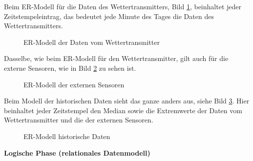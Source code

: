 Beim ER-Modell für die Daten des Wettertransmitters, Bild \ref{img:ER_Modell Wettertransmitter},  beinhaltet jeder Zeitstempeleintrag, das bedeutet jede Minute des Tages die Daten des Wettertransmitters. 

\begin{figure}[h!]
	\centering
	\caption{ER-Modell der Daten vom Wettertransmitter}
	\label{img:ER_Modell Wettertransmitter}
\end{figure}

Dasselbe, wie beim ER-Modell für den Wettertransmitter, gilt auch für die externe Sensoren, wie in Bild \ref{img:ER_Modell externe Sensoren} zu sehen ist. 
\begin{figure}[h!]
	\centering
	\caption{ER-Modell der externen Sensoren}
	\label{img:ER_Modell externe Sensoren}
\end{figure}

Beim Modell der historischen Daten sieht das ganze anders aus, siehe Bild \ref{img:ER_Modell historische Daten}. Hier beinhaltet jeder Zeitstempel den Median sowie die Extremwerte der Daten vom Wettertransmitter und die der externen Sensoren. 

\begin{figure}[h!]
	\centering
	\caption{ER-Modell historische Daten}
	\label{img:ER_Modell historische Daten}
\end{figure}

\textbf{Logische Phase (relationales Datenmodell)}\\

